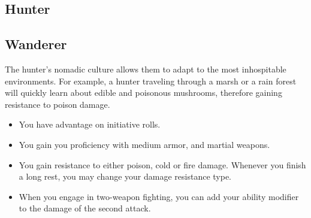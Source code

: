 
\begin{multicols*}{2}

\section{Hunter}

\subsection*{Wanderer}

The hunter's nomadic culture allows them to adapt to the most inhospitable environments. For example, a hunter traveling through a marsh or a rain forest will quickly learn about edible and poisonous mushrooms, therefore gaining resistance to poison damage.



\begin{itemize}
    \item You have advantage on initiative rolls.
    \item You gain you proficiency with medium armor, and martial weapons.
    \item You gain resistance to either poison, cold or fire damage. Whenever you finish a long rest, you may change your damage resistance type.
    \item When you engage in two-weapon fighting, you can add your ability modifier to the damage of the second attack.    
\end{itemize}


\end{multicols*}
